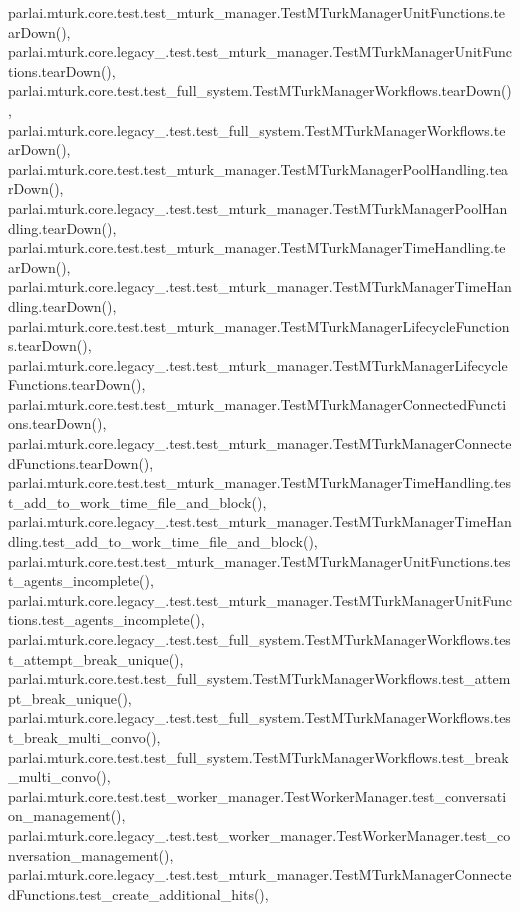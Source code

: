 parlai.\+mturk.\+core.\+test.\+test\+\_\+mturk\+\_\+manager.\+Test\+M\+Turk\+Manager\+Unit\+Functions.\+tear\+Down(), parlai.\+mturk.\+core.\+legacy\+\_.\+test.\+test\+\_\+mturk\+\_\+manager.\+Test\+M\+Turk\+Manager\+Unit\+Functions.\+tear\+Down(), parlai.\+mturk.\+core.\+test.\+test\+\_\+full\+\_\+system.\+Test\+M\+Turk\+Manager\+Workflows.\+tear\+Down(), parlai.\+mturk.\+core.\+legacy\+\_.\+test.\+test\+\_\+full\+\_\+system.\+Test\+M\+Turk\+Manager\+Workflows.\+tear\+Down(), parlai.\+mturk.\+core.\+test.\+test\+\_\+mturk\+\_\+manager.\+Test\+M\+Turk\+Manager\+Pool\+Handling.\+tear\+Down(), parlai.\+mturk.\+core.\+legacy\+\_.\+test.\+test\+\_\+mturk\+\_\+manager.\+Test\+M\+Turk\+Manager\+Pool\+Handling.\+tear\+Down(), parlai.\+mturk.\+core.\+test.\+test\+\_\+mturk\+\_\+manager.\+Test\+M\+Turk\+Manager\+Time\+Handling.\+tear\+Down(), parlai.\+mturk.\+core.\+legacy\+\_.\+test.\+test\+\_\+mturk\+\_\+manager.\+Test\+M\+Turk\+Manager\+Time\+Handling.\+tear\+Down(), parlai.\+mturk.\+core.\+test.\+test\+\_\+mturk\+\_\+manager.\+Test\+M\+Turk\+Manager\+Lifecycle\+Functions.\+tear\+Down(), parlai.\+mturk.\+core.\+legacy\+\_.\+test.\+test\+\_\+mturk\+\_\+manager.\+Test\+M\+Turk\+Manager\+Lifecycle\+Functions.\+tear\+Down(), parlai.\+mturk.\+core.\+test.\+test\+\_\+mturk\+\_\+manager.\+Test\+M\+Turk\+Manager\+Connected\+Functions.\+tear\+Down(), parlai.\+mturk.\+core.\+legacy\+\_.\+test.\+test\+\_\+mturk\+\_\+manager.\+Test\+M\+Turk\+Manager\+Connected\+Functions.\+tear\+Down(), parlai.\+mturk.\+core.\+test.\+test\+\_\+mturk\+\_\+manager.\+Test\+M\+Turk\+Manager\+Time\+Handling.\+test\+\_\+add\+\_\+to\+\_\+work\+\_\+time\+\_\+file\+\_\+and\+\_\+block(), parlai.\+mturk.\+core.\+legacy\+\_.\+test.\+test\+\_\+mturk\+\_\+manager.\+Test\+M\+Turk\+Manager\+Time\+Handling.\+test\+\_\+add\+\_\+to\+\_\+work\+\_\+time\+\_\+file\+\_\+and\+\_\+block(), parlai.\+mturk.\+core.\+test.\+test\+\_\+mturk\+\_\+manager.\+Test\+M\+Turk\+Manager\+Unit\+Functions.\+test\+\_\+agents\+\_\+incomplete(), parlai.\+mturk.\+core.\+legacy\+\_.\+test.\+test\+\_\+mturk\+\_\+manager.\+Test\+M\+Turk\+Manager\+Unit\+Functions.\+test\+\_\+agents\+\_\+incomplete(), parlai.\+mturk.\+core.\+legacy\+\_.\+test.\+test\+\_\+full\+\_\+system.\+Test\+M\+Turk\+Manager\+Workflows.\+test\+\_\+attempt\+\_\+break\+\_\+unique(), parlai.\+mturk.\+core.\+test.\+test\+\_\+full\+\_\+system.\+Test\+M\+Turk\+Manager\+Workflows.\+test\+\_\+attempt\+\_\+break\+\_\+unique(), parlai.\+mturk.\+core.\+legacy\+\_.\+test.\+test\+\_\+full\+\_\+system.\+Test\+M\+Turk\+Manager\+Workflows.\+test\+\_\+break\+\_\+multi\+\_\+convo(), parlai.\+mturk.\+core.\+test.\+test\+\_\+full\+\_\+system.\+Test\+M\+Turk\+Manager\+Workflows.\+test\+\_\+break\+\_\+multi\+\_\+convo(), parlai.\+mturk.\+core.\+test.\+test\+\_\+worker\+\_\+manager.\+Test\+Worker\+Manager.\+test\+\_\+conversation\+\_\+management(), parlai.\+mturk.\+core.\+legacy\+\_.\+test.\+test\+\_\+worker\+\_\+manager.\+Test\+Worker\+Manager.\+test\+\_\+conversation\+\_\+management(), parlai.\+mturk.\+core.\+legacy\+\_.\+test.\+test\+\_\+mturk\+\_\+manager.\+Test\+M\+Turk\+Manager\+Connected\+Functions.\+test\+\_\+create\+\_\+additional\+\_\+hits(), 